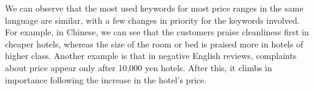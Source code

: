 \documentclass[smallextended,natbib]{svjour3}       %
\begin{document}
    We can observe that the most used keywords for most price ranges in the same language are similar, with a few changes in priority for the keywords involved. For example, in Chinese, we can see that the customers praise cleanliness first in cheaper hotels, whereas the size of the room or bed is praised more in hotels of higher class. Another example is that in negative English reviews, complaints about price appear only after 10,000 yen hotels. After this, it climbs in importance following the increase in the hotel's price.


    \begin{table}[ht]
      \centering
      \caption{English and Chinese comparison of the top 10 positive keywords.}
      \label{tab:freq_res_pos}
\end{table}
\end{document}
